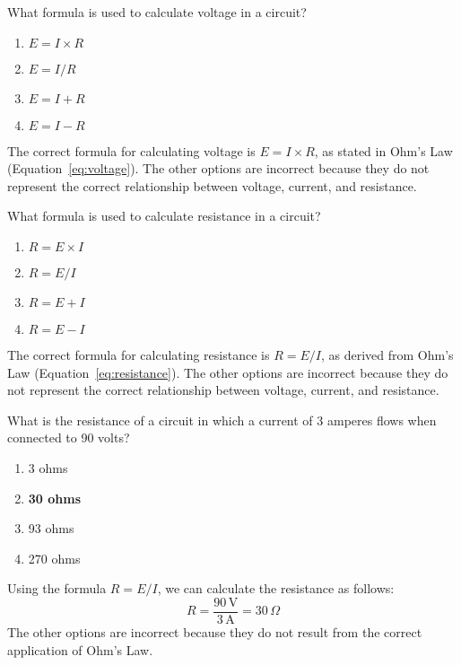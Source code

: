 
\begin{tcolorbox}[colback=gray!10!white,colframe=black!75!black,title={T5D02}]
    What formula is used to calculate voltage in a circuit?
    \begin{enumerate}[label=\Alph*,noitemsep]
        \item \textbf{\(E = I \times R\)}
        \item \(E = I / R\)
        \item \(E = I + R\)
        \item \(E = I - R\)
    \end{enumerate}
\end{tcolorbox}
The correct formula for calculating voltage is \(E = I \times R\), as stated in Ohm's Law (Equation~\ref{eq:voltage}). The other options are incorrect because they do not represent the correct relationship between voltage, current, and resistance.


\begin{tcolorbox}[colback=gray!10!white,colframe=black!75!black,title={T5D03}]
    What formula is used to calculate resistance in a circuit?
    \begin{enumerate}[label=\Alph*,noitemsep]
        \item \(R = E \times I\)
        \item \textbf{\(R = E / I\)}
        \item \(R = E + I\)
        \item \(R = E - I\)
    \end{enumerate}
\end{tcolorbox}
The correct formula for calculating resistance is \(R = E / I\), as derived from Ohm's Law (Equation~\ref{eq:resistance}). The other options are incorrect because they do not represent the correct relationship between voltage, current, and resistance.


\begin{tcolorbox}[colback=gray!10!white,colframe=black!75!black,title={T5D04}]
    What is the resistance of a circuit in which a current of 3 amperes flows when connected to 90 volts?
    \begin{enumerate}[label=\Alph*,noitemsep]
        \item 3 ohms
        \item \textbf{30 ohms}
        \item 93 ohms
        \item 270 ohms
    \end{enumerate}
\end{tcolorbox}
Using the formula \(R = E / I\), we can calculate the resistance as follows:
\[
R = \frac{90\, \text{V}}{3\, \text{A}} = 30\, \Omega
\]
The other options are incorrect because they do not result from the correct application of Ohm's Law.

